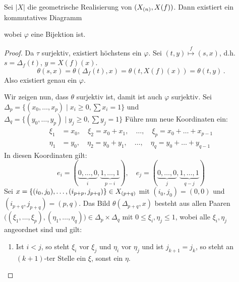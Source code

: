 \begin{lemma}
  Sei $|X|$ die geometrische Realisierung von $(X_{(n)}, X(f))$. Dann
  existiert ein kommutatives Diagramm
  \begin{center}
  \end{center}
  wobei $\varphi$ eine Bijektion ist.
\end{lemma}
\begin{proof}
  Da $\tau$ surjektiv, existiert höchstens ein $\varphi$. Sei 
  $(t,y) \overset f \longmapsto (s,x)$, d.h. $s = \Delta_f(t)$, 
  $y = X(f)(x)$.
  \[ \theta(s,x) = \theta(\Delta_f(t),x) = \theta(t, X(f)(x))
    = \theta(t,y)\,.\]
  Also existiert genau ein $\varphi$.

  Wir zeigen nun, dass $\theta$ surjektiv ist, damit ist auch $\varphi$
  surjektiv.
  Sei $\Delta_p = \{ (x_0,\ldots, x_p) \mid x_i\geq 0, \sum x_i = 1\}$
  und $\Delta_q = \{ (y_0,\ldots,y_p) \mid y_j\geq 0, \sum y_j = 1\}$
  Führe nun neue Koordinaten ein:
  \begin{align*}
    \xi_1 &= x_0,\quad \xi_2 = x_0+x_1,\quad\ldots,\quad 
      \xi_p = x_0 + \ldots + x_{p-1}\\
    \eta_1 &= y_0, \quad \eta_2 = y_0+y_1, \quad\ldots,\quad 
      \eta_q = y_0 + \ldots + y_{q-1}
  \end{align*}
  In diesen Koordinaten gilt:
  \[ e_i = (\underbrace{0,\ldots,0}_i, \underbrace{1,\ldots,1}_{p-i}),\quad
  e_j = (\underbrace{0,\ldots,0}_j, \underbrace{1,\ldots,1}_{q-j}) \]
  Sei $x = \{(i_0,j_0) ,\ldots, (i_{p+p},j_{p+q})\} \in X_{(p+q)}$ mit
  $(i_0,j_0) = (0,0)$ und $(i_{p+q},j_{p+q}) = (p,q)$.
  Das Bild $\theta(\Delta_{p+q}, x)$ besteht aus allen Paaren
  $\big( (\xi_1,\ldots,\xi_p),(\eta_1,\ldots,\eta_q) \big) \in 
  \Delta_p\times\Delta_q$ mit $0\leq \xi_i,\eta_j\leq 1$, wobei alle
  $\xi_i,\eta_j$ angeordnet sind und gilt:
  \begin{enumerate}[label=(\roman*)]
    \item Ist $i<j$, so steht $\xi_i$ vor $\xi_j$ und $\eta_i$ vor $\eta_j$
      und ist $j_{k+1} = j_k$, so steht an $(k+1)$-ter Stelle
      ein $\xi$, sonst ein $\eta$.
  \end{enumerate}
\end{proof}

